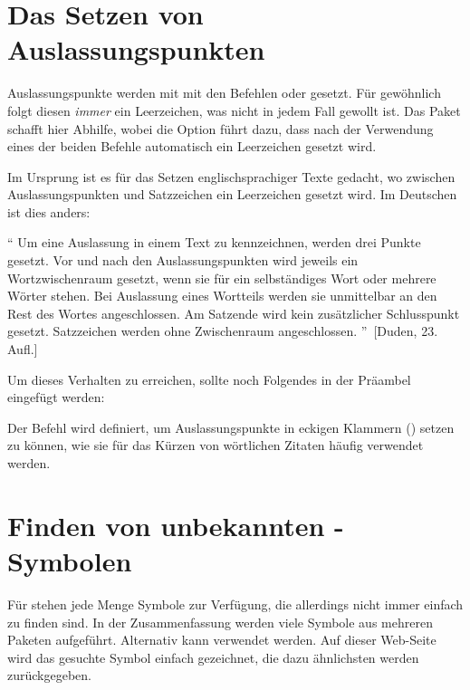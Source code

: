 \section{Das Setzen von Auslassungspunkten}
%
%
%
Auslassungspunkte werden mit  mit den Befehlen  oder 
 gesetzt. Für gewöhnlich folgt diesen \emph{immer} ein 
Leerzeichen, was nicht in jedem Fall gewollt ist. Das Paket  
schafft hier Abhilfe, wobei die Option  führt dazu, dass nach 
der Verwendung eines der beiden Befehle automatisch ein Leerzeichen gesetzt 
wird. 
%
\begin{quoting}
\begin{Code}
\usepackage[xspace]{ellipsis}
\end{Code}
\end{quoting}
%
Im Ursprung ist es für das Setzen englischsprachiger Texte gedacht, wo zwischen 
Auslassungspunkten und Satzzeichen ein Leerzeichen gesetzt wird. Im Deutschen 
ist dies anders:
%
\begin{quoting}
\enquote{%
  Um eine Auslassung in einem Text zu kennzeichnen, werden drei Punkte gesetzt. 
  Vor und nach den Auslassungspunkten wird jeweils ein Wortzwischenraum 
  gesetzt, wenn sie für ein selbständiges Wort oder mehrere Wörter stehen. Bei 
  Auslassung eines Wortteils werden sie unmittelbar an den Rest des Wortes 
  angeschlossen. Am Satzende wird kein zusätzlicher Schlusspunkt gesetzt. 
  Satzzeichen werden ohne Zwischenraum angeschlossen.%
}~[Duden, 23. Aufl.]
\end{quoting} 
%
Um dieses Verhalten zu erreichen, sollte noch Folgendes in der Präambel 
eingefügt werden:
%
\begin{quoting}
\begin{Code}
\let\ellipsispunctuation\relax
\newcommand*{\qdots}{[\dots{}]\xspace}
\end{Code}
\end{quoting}
%
Der Befehl  wird definiert, um Auslassungspunkte in eckigen 
Klammern (\POParameter{\dots}) setzen zu können, wie sie für das Kürzen von 
wörtlichen Zitaten häufig verwendet werden.



\section{Finden von unbekannten -Symbolen}
%
%
Für  stehen jede Menge Symbole zur Verfügung, die allerdings 
nicht immer einfach zu finden sind. In der Zusammenfassung
werden viele Symbole aus mehreren Paketen aufgeführt. Alternativ kann 
 verwendet werden. 
Auf dieser Web-Seite wird das gesuchte Symbol einfach gezeichnet, die dazu 
ähnlichsten werden zurückgegeben.



